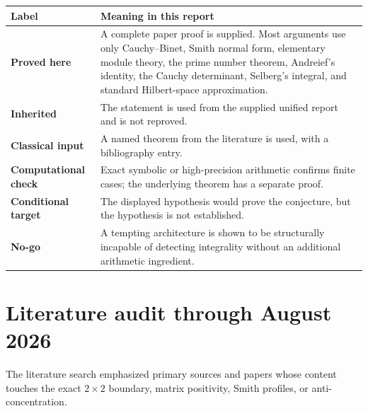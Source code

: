 \documentclass[11pt,oneside]{article}
\theoremstyle{definition}
\theoremstyle{remark}
\begin{document}
\begin{longtable}{@{}>{\raggedright\arraybackslash}p{}>{\raggedright\arraybackslash}p{}@{}}
\toprule
Label & Meaning in this report \\
\midrule
\endhead
\textbf{Proved here} & A complete paper proof is supplied.  Most arguments use only Cauchy--Binet, Smith normal form, elementary module theory, the prime number theorem, Andreief's identity, the Cauchy determinant, Selberg's integral, and standard Hilbert-space approximation.\\
\textbf{Inherited} & The statement is used from the supplied unified report and is not reproved.\\
\textbf{Classical input} & A named theorem from the literature is used, with a bibliography entry.\\
\textbf{Computational check} & Exact symbolic or high-precision arithmetic confirms finite cases; the underlying theorem has a separate proof.\\
\textbf{Conditional target} & The displayed hypothesis would prove the conjecture, but the hypothesis is not established.\\
\textbf{No-go} & A tempting architecture is shown to be structurally incapable of detecting integrality without an additional arithmetic ingredient.\\
\bottomrule
\end{longtable}

\section{Literature audit through August 2026}
\label{sec:literature}

The literature search emphasized primary sources and papers whose content touches the exact $2\times2$ boundary, matrix positivity, Smith profiles, or anti-concentration.
\end{document}
